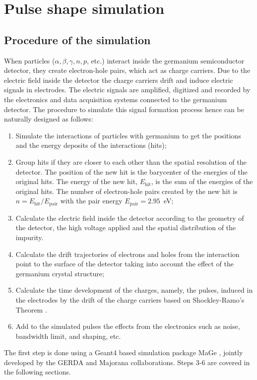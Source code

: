 \documentclass[epj]{svjour}
\begin{document}
\section{Pulse shape simulation}
\label{s:pss}
\subsection{Procedure of the simulation}
\label{s:proc}
When particles ($\alpha, \beta, \gamma, n, p$, etc.) interact inside
the germanium semiconductor detector, they create electron-hole pairs,
which act as charge carriers. Due to the electric field inside the
detector the charge carriers drift and induce electric signals in
electrodes. The electric signals are amplified, digitized and recorded
by the electronics and data acquisition systems connected to the
germanium detector. The procedure to simulate this signal formation
process hence can be naturally designed as follows:
\begin{enumerate} 
\item Simulate the interactions of particles with germanium to get the
positions and the energy deposits of the interactions (hits);
\item Group hits if they are closer to each other than the spatial
resolution of the detector. The position of the new hit is the
barycenter of the energies of the original hits. The energy of the new
hit, $E_{\mbox{hit}}$, is the sum of the energies of the original
hits. The number of electron-hole pairs created by the new hit is $n =
E_{\mbox{hit}} / E_{\mbox{pair}}$ with the pair energy
$E_{\mbox{pair}} = 2.95$~eV;
\item Calculate the electric field inside the detector according to
the geometry of the detector, the high voltage applied and the spatial
distribution of the impurity.
\item Calculate the drift trajectories of electrons and holes from the
interaction point to the surface of the detector taking into account
the effect of the germanium crystal structure;
\item Calculate the time development of the charges, namely, the
pulses, induced in the electrodes by the drift of the charge carriers
based on Shockley-Ramo's Theorem \cite{Gat82,Rad88,He00}.
\item Add to the simulated pulses the effects from the electronics
such as noise, bandwidth limit, and shaping, etc.
\end{enumerate} 
The first step is done using a Geant4 \cite{G403,G406} based
simulation package MaGe \cite{MaGe}, jointly developed by the GERDA
and Majorana collaborations. Steps 3-6 are covered in the following
sections.
\end{document}
